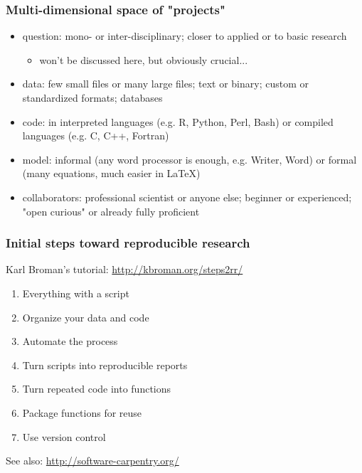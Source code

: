 \documentclass[c]{beamer} %
\begin{document}
\begin{frame}
  \frametitle{Multi-dimensional space of "projects"}
  \begin{itemize}
  \item \alert{question}: mono- or inter-disciplinary; closer to applied or to basic research
    \begin{itemize}
    \item won't be discussed here, but obviously crucial...
    \end{itemize}
    \medskip
    \pause
  \item \alert{data}: few small files or many large files; text or binary; custom or standardized formats; databases
    \medskip
    \pause
  \item \alert{code}: in interpreted languages (e.g. R, Python, Perl, Bash) or compiled languages (e.g. C, C++, Fortran)
    \medskip
    \pause
  \item \alert{model}: informal (any word processor is enough, e.g. Writer, Word) or formal (many equations, much easier in LaTeX)
    \medskip
    \pause
  \item \alert{collaborators}: professional scientist or anyone else; beginner or experienced; "open curious" or already fully proficient
  \end{itemize}
\end{frame}

\begin{frame}
  \frametitle{Initial steps toward reproducible research}
  Karl Broman's tutorial: \url{http://kbroman.org/steps2rr/}
  
  \bigskip
  
  \begin{enumerate}
  \item Everything with a script
  \item Organize your data and code
  \item Automate the process
  \item Turn scripts into reproducible reports
  \item Turn repeated code into functions
  \item Package functions for reuse
  \item Use version control
  \end{enumerate}
  
  \bigskip
  \pause
  
  See also: \url{http://software-carpentry.org/}
\end{frame}
\end{document}
